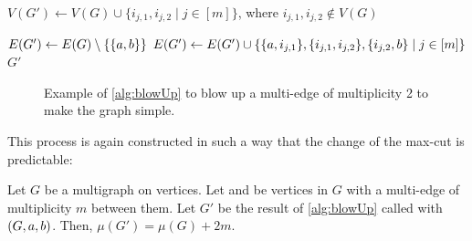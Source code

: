 \documentclass[a4paper,UKenglish,cleveref, thm-restate]{lipics-v2021}
\begin{document}
\begin{algorithm}[h!]
\caption{Simplifying a multi-edge of multiplicity $m$}\label{alg:blowUp}
\begin{algorithmic}[1]

\State $V(G') \gets V(G) \cup \{i_{j,1}, i_{j,2} \;\vert\; j\in [m]\}$, where $i_{j,1},i_{j,2}\notin V(G)$

\State $E(G') \gets E(G) \setminus \{\{\nodeA, \nodeB\}\}$ 
\State $E(G') \gets E(G') \cup \{\{\nodeA, i_{j,1}\},\{i_{j,1}, i_{j,2}\},\{i_{j,2}, \nodeB\} \;\vert\; j\in [m]\}$
\State \Return $G'$

\end{algorithmic}
\end{algorithm}

\begin{figure}[h!]
\centering
{}
\caption{Example of \cref{alg:blowUp} to blow up a multi-edge of multiplicity 2 to make the graph simple.}
\label{fig:blowUpMultiedges}
\end{figure}

This process is again constructed in such a way that the change of the max-cut is predictable:
\begin{lemma}
\label{lem:blowUp}
Let $G$ be a multigraph on \dimension vertices.
Let \nodeA and \nodeB be vertices in $G$ with a multi-edge of multiplicity $m$ between them.
Let $G'$ be the result of \cref{alg:blowUp} called with $(G, \nodeA, \nodeB)$. Then, $\mu(G')=\mu(G)+2m$.
\end{lemma}
\end{document}
